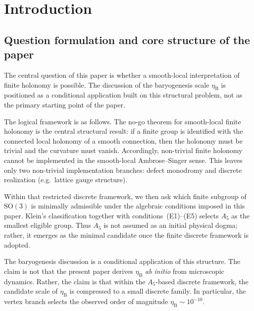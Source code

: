 \documentclass[sn-mathphys-num,Numbered]{sn-jnl}
\theoremstyle{thmstyleone}
\theoremstyle{thmstylethree}
\theoremstyle{thmstyletwo}
\newcommand{\SO}{\mathrm{SO}}
\newcommand{\etaB}{\eta_{\mathrm{B}}}
\begin{document}
\maketitle

\section{Introduction}
\label{sec:intro}

\subsection{Question formulation and core structure of the paper}
\label{ssec:question}

The central question of this paper is whether a smooth-local
interpretation of finite holonomy is possible. The discussion of the
baryogenesis scale $\etaB$ is positioned as a conditional application
built on this structural problem, not as the primary starting point of
the paper.

The logical framework is as follows. The no-go theorem for smooth-local
finite holonomy is the central structural result: if a finite group is
identified with the connected local holonomy of a smooth connection,
then the holonomy must be trivial and the curvature must vanish.
Accordingly, non-trivial finite holonomy cannot be implemented in the
smooth-local Ambrose--Singer sense. This leaves only two non-trivial
implementation branches: defect monodromy and discrete realization
(e.g.\ lattice gauge structure).

Within that restricted discrete framework, we then ask which finite
subgroup of $\SO(3)$ is minimally admissible under the algebraic
conditions imposed in this paper. Klein's classification together with
conditions~(E1)--(E5) selects $A_5$ as the smallest eligible group.
Thus $A_5$ is not assumed as an initial physical dogma; rather, it
emerges as the minimal candidate once the finite discrete framework is
adopted.

The baryogenesis discussion is a conditional application of this
structure. The claim is not that the present paper derives $\etaB$
\emph{ab initio} from microscopic dynamics. Rather, the claim is that
within the $A_5$-based discrete framework, the candidate scale of
$\etaB$ is compressed to a small discrete family. In particular, the
vertex branch selects the observed order of magnitude
$\etaB\sim10^{-10}$.
\end{document}
